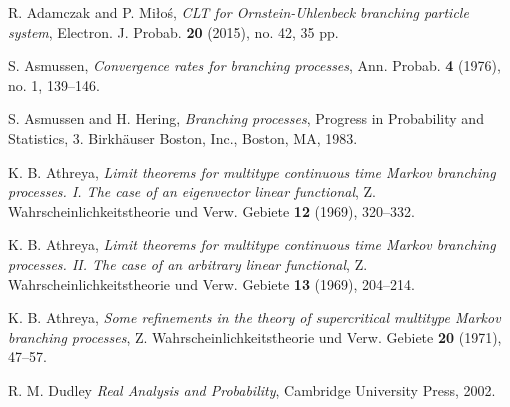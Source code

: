 \documentclass[12pt,a4paper]{amsart}
\theoremstyle{plain}
\theoremstyle{definition}
\numberwithin{equation}{section}
\begin{document}
\begin{thebibliography}{10}

  R. Adamczak and P. Mi{\l}o\'{s}, \emph{C{LT} for {O}rnstein-{U}hlenbeck branching particle system},
  Electron. J. Probab. \textbf{20} (2015), no. 42, 35 pp.

  S. Asmussen, \emph{Convergence rates for branching processes},
  Ann. Probab.  \textbf{4} (1976), no. 1, 139--146.

  S. Asmussen and H. Hering, \emph{Branching processes},
  Progress in Probability and Statistics, 3. Birkh\"{a}user Boston, Inc., Boston, MA, 1983.

  K. B. Athreya,
  \emph{Limit theorems for multitype continuous time {M}arkov branching processes. {I}. {T}he case of an eigenvector linear functional},
  Z. Wahrscheinlichkeitstheorie und Verw. Gebiete \textbf{12} (1969), 320--332.

  K. B. Athreya,
  \emph{Limit theorems for multitype continuous time {M}arkov branching processes. {II}. {T}he case of an arbitrary linear functional},
  Z. Wahrscheinlichkeitstheorie und Verw. Gebiete \textbf{13} (1969), 204--214.

  K. B. Athreya,
  \emph{Some refinements in the theory of supercritical multitype {M}arkov branching processes},
  Z. Wahrscheinlichkeitstheorie und Verw. Gebiete \textbf{20} (1971), 47--57.

%
%
%
%
%
%
%
  R. M. Dudley
\emph{Real Analysis and Probability},
  Cambridge University Press, 2002.


\end{thebibliography}
\end{document}
